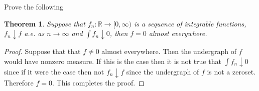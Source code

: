 \documentclass[letter]{article}
\newtheorem{theorem}{Theorem}
\newenvironment{menumerate}{%
  \edef\backupindent{\the\parindent}%
  \enumerate%
  \setlength{\parindent}{\backupindent}%
}{\endenumerate}
\begin{document}
\begin{menumerate}
     \setcounter{enumi}{32}
     \item
     \item Prove the following

     \begin{theorem}
         Suppose that $f_n : \mathbb{R} \to [0, \infty)$ is a
         sequence of integrable functions, $f_n \downarrow f$ a.e. as $n \to \infty$ and $\int f_n \downarrow 0$, then $f = 0$ almost everywhere.
     \end{theorem}
     \begin{proof}
        Suppose that that $f \neq 0$ almost everywhere. Then the undergraph of $f$ would have nonzero measure. If this is the case 
        then it is not true that $\int f_n \downarrow 0$ since if it were the case then not $f_n \downarrow f$ since the undergraph of $f$ is not a zeroset. Therefore $f = 0.$ This completes the proof.
     \end{proof}
     \item 
\end{menumerate}
\end{document}
